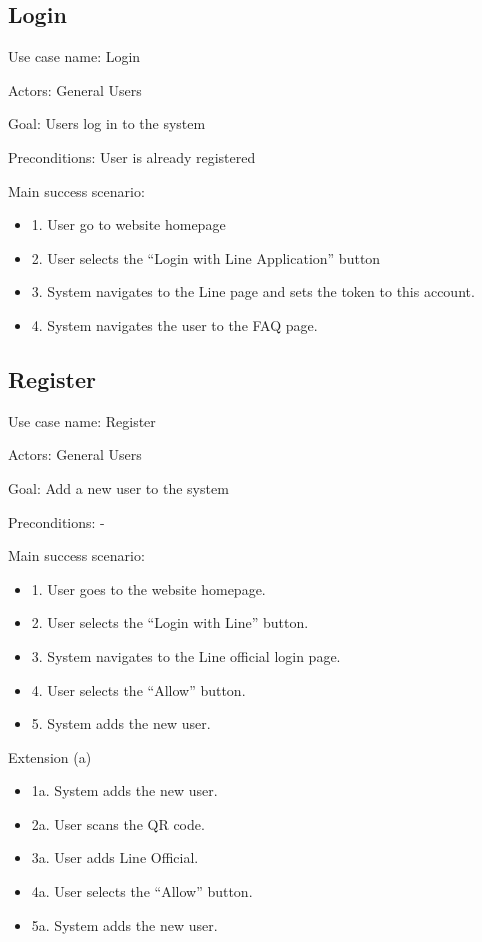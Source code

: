 \documentclass[12pt,oneside,openright,a4paper]{cpe-english-project}
\begin{document}
    \subsection{Login}
      \qquad Use case name: Login \par
      \qquad Actors: General Users \par
      \qquad Goal: Users log in to the system \par
      \qquad Preconditions: User is already registered \par
      \qquad Main success scenario:
      \begin{itemize}
        \item[] 1. User go to website homepage
        \item[] 2. User selects the “Login with Line Application” button
        \item[] 3. System navigates to the Line page and sets the token to this account.
        \item[] 4. System navigates the user to the FAQ page.
      \end{itemize}

      \subsection{Register}
        \qquad Use case name: Register \par
        \qquad Actors: General Users \par
        \qquad Goal: Add a new user to the system \par
        \qquad Preconditions: - \par
        \qquad Main success scenario:
        \begin{itemize}
          \item[] 1. User goes to the website homepage.
          \item[] 2. User selects the “Login with Line” button.
          \item[] 3. System navigates to the Line official login page.
          \item[] 4. User selects the “Allow” button.
          \item[] 5. System adds the new user.
        \end{itemize}
        \qquad Extension (a)
        \begin{itemize}
          \item[] 1a. System adds the new user.
          \item[] 2a. User scans the QR code. 
          \item[] 3a. User adds Line Official.
          \item[] 4a. User selects the “Allow” button. 
          \item[] 5a. System adds the new user.
        \end{itemize}
      
\end{document}

